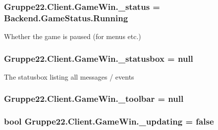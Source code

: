 \hypertarget{class_gruppe22_1_1_client_1_1_game_win_ac750d57d47285a3f2b1913b3ea784bdf}{
\subsubsection[{\-\_\-status}]{ Gruppe22.\-Client.\-Game\-Win.\-\_\-status = Backend.\-Game\-Status.\-Running\hspace{0.3cm}{\ttfamily [protected]}}}\label{class_gruppe22_1_1_client_1_1_game_win_ac750d57d47285a3f2b1913b3ea784bdf}


Whether the game is paused (for menus etc.) 

\hypertarget{class_gruppe22_1_1_client_1_1_game_win_a85609a2680f405bc25b355fd0c0c844f}{
\subsubsection[{\-\_\-statusbox}]{ Gruppe22.\-Client.\-Game\-Win.\-\_\-statusbox = null\hspace{0.3cm}{\ttfamily [protected]}}}\label{class_gruppe22_1_1_client_1_1_game_win_a85609a2680f405bc25b355fd0c0c844f}


The statusbox listing all messages / events 

\hypertarget{class_gruppe22_1_1_client_1_1_game_win_afd60e675c2675a7bf33ada1b98d93089}{
\subsubsection[{\-\_\-toolbar}]{ Gruppe22.\-Client.\-Game\-Win.\-\_\-toolbar = null\hspace{0.3cm}{\ttfamily [protected]}}}\label{class_gruppe22_1_1_client_1_1_game_win_afd60e675c2675a7bf33ada1b98d93089}
\hypertarget{class_gruppe22_1_1_client_1_1_game_win_af535ea47ceef795b292d3b831a628e32}{
\subsubsection[{\-\_\-updating}]{\setlength{\rightskip}{0pt plus 5cm}bool Gruppe22.\-Client.\-Game\-Win.\-\_\-updating = false\hspace{0.3cm}{\ttfamily [protected]}}}\label{class_gruppe22_1_1_client_1_1_game_win_af535ea47ceef795b292d3b831a628e32}


